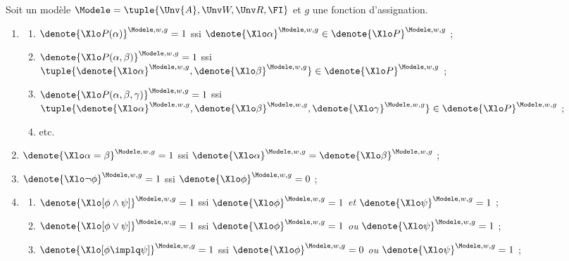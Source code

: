 \begin{defi}
\label{RIw}
Soit un modèle \(\Modele = \tuple{\Unv{A},\Unv W,\Unv R,\FI}\) et $g$ une fonction
d'assignation. %
\begin{enumerate}[sem,series=RglSem3] %
  \item \raggedright
\label{RIprdw}
\begin{enumerate}
\item
$\denote{\Xlo P(\alpha)}^{\Modele,w,g}=1$ ssi \(\denote{\Xlo\alpha}^{\Modele,w,g} \in
\denote{\Xlo P}^{\Modele,w,g}\) ; 
%
\item %
$\denote{\Xlo P(\alpha,\beta)}^{\Modele,w,g}=1$ ssi
\(\tuple{\denote{\Xlo\alpha}^{\Modele,w,g},\denote{\Xlo\beta}^{\Modele,w,g}} \in 
\denote{\Xlo P}^{\Modele,w,g}\) ; 
%
\item %
$\denote{\Xlo P(\alpha,\beta,\gamma)}^{\Modele,w,g}=1$ ssi
\(\tuple{\denote{\Xlo\alpha}^{\Modele,w,g},\denote{\Xlo\beta}^{\Modele,w,g},\denote{\Xlo\gamma}^{\Modele,w,g}}
\in \denote{\Xlo P}^{\Modele,w,g}\) ; 
%
\item etc.
  \end{enumerate}
\item \label{RI=w}
\(\denote{\Xlo\alpha = \beta}^{\Modele,w,g}=1\) ssi
\(\denote{\Xlo\alpha}^{\Modele,w,g}=\denote{\Xlo\beta}^{\Modele,w,g}\) ; 
\item \label{RInegw}
\(\denote{\Xlo\neg\phi}^{\Modele,w,g}=1\) ssi
\(\denote{\Xlo\phi}^{\Modele,w,g}=0\) ; 
\item \label{RIconw}
  \begin{enumerate}
\item $\denote{\Xlo[\phi \wedge \psi]}^{\Modele,w,g}=1$ ssi $\denote{\Xlo\phi}^{\Modele,w,g}=1$ \emph{et} $\denote{\Xlo\psi}^{\Modele,w,g}=1$ ;
\item $\denote{\Xlo[\phi \vee \psi]}^{\Modele,w,g}=1$ ssi $\denote{\Xlo\phi}^{\Modele,w,g}=1$ \emph{ou} $\denote{\Xlo\psi}^{\Modele,w,g}=1$ ;
\item $\denote{\Xlo[\phi \implq \psi]}^{\Modele,w,g}=1$ ssi $\denote{\Xlo\phi}^{\Modele,w,g}=0$ \emph{ou} $\denote{\Xlo\psi}^{\Modele,w,g}=1$ ;

\end{enumerate}
\end{enumerate}
\end{defi}
